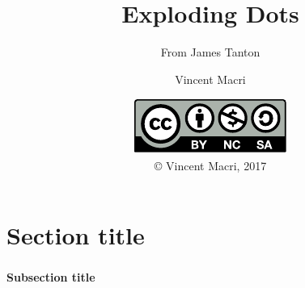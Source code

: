 \documentclass[mathserif]{beamer}
\title{Exploding Dots}
\subtitle{From James Tanton}
\author{Vincent Macri}
\date{\includegraphics{by-nc-sa}\\\copyright{} Vincent Macri, 2017}
\newenvironment{namedframe}[1]%
	{\begin{frame}\frametitle{\secname}\framesubtitle{#1}}
	{\end{frame}}
\begin{document}
	\frame{\titlepage}
	\section{Section title}
	\begin{namedframe}{Subsection title}
	\end{namedframe}
\end{document}
